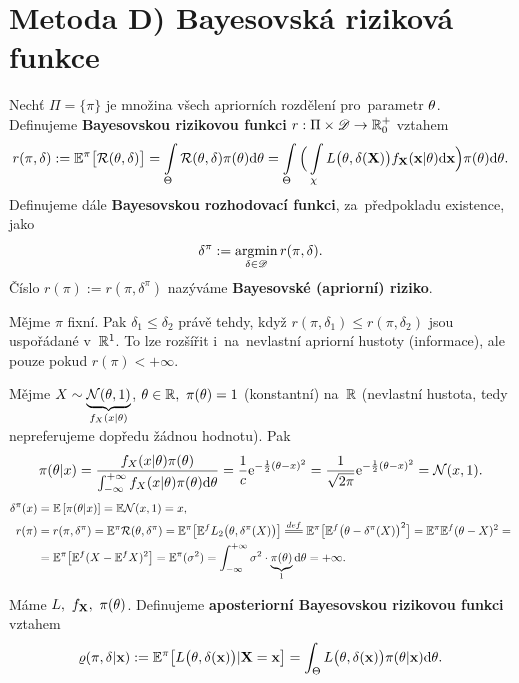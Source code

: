 \section{Metoda D) Bayesovská riziková funkce} 
\begin{define}
	Nechť $\Pi=\{ \pi\}$ je množina všech apriorních rozdělení pro~parametr $\theta$. Definujeme \textbf{Bayesovskou rizikovou funkci} $r:\Pi\times\mathscr{D} \to\mathbb{R}_0^+$ vztahem
	$$ r(\pi,\delta):=\mathbb{E}^\pi\big[ \mathcal{R}(\theta,\delta) \big]=\int\limits_{\Theta}\mathcal{R}(\theta,\delta)\pi(\theta)\mathrm{d}\theta=\int\limits_{\Theta}\Big( \int\limits_{\chi}L\big(\theta,\delta(\textbf{X})\big)f_\textbf{X}(\textbf{x}|\theta)\mathrm{d}\textbf{x} \Big)\pi(\theta)\mathrm{d}\theta.$$
	Definujeme dále \textbf{Bayesovskou rozhodovací funkci}, za~předpokladu existence, jako $$\delta^\pi:=\mathop{\mathrm{argmin}}\limits_{\delta\in\mathscr{D}}r(\pi,\delta).$$ 
	Číslo $r(\pi):=r(\pi,\delta^\pi)$ nazýváme \textbf{Bayesovské (apriorní) riziko}.  
	
\end{define}
\begin{remark}
	Mějme $\pi$ fixní. Pak $\delta_1\leq\delta_2$ právě tehdy, když $r(\pi,\delta_1)\leq r(\pi,\delta_2)$ jsou uspořádané v~$\mathbb{R}^1$. To lze rozšířit i~na~nevlastní apriorní hustoty (informace), ale pouze pokud $r(\pi)<+\infty$.
\end{remark}
\begin{example}
	Mějme $X\sim\underbrace{\mathcal{N}(\theta,1)}_{f_X(x|\theta)}$, $\theta\in\mathbb{R},~\pi(\theta)=1$ (konstantní) na~$\mathbb{R}$ (nevlastní hustota, tedy nepreferujeme dopředu žádnou hodnotu). Pak
	$$ \pi(\theta|x)=\frac{f_X(x|\theta) \pi(\theta)}{\int_{-\infty}^{+\infty}f_X(x|\theta) \pi(\theta)\mathrm{d}\theta}=\frac{1}{c}\mathrm{e}^{-\frac{1}{2}(\theta-x)^2}=\frac{1}{\sqrt{2\pi}}\mathrm{e}^{-\frac{1}{2}(\theta-x)^2}=\mathcal{N}(x,1).$$
	\[\begin{split}
	\delta^\pi(x)&=\EE{\pi(\t|x)}=\E\NN(x,1)=x,\\
	r(\pi)&= r(\pi,\delta^\pi)=\E^\pi \RF(\t,\delta^\pi)=\E^\pi\big[\E^f L_2\big(\t,\delta^\pi(X)\big)\big]\equal{def}\E^\pi\big[ \E^f\big(\t-\delta^\pi(X) \big)^2 \big]=\E^\pi\E^f(\t-X)^2=\\&=\E^\pi\big[ \E^f(X-\E^fX)^2 \big]=\E^\pi(\sigma^2)=\int_{-\infty}^{+\infty}\sigma^2\cdot \underbrace{\pi(\t)}_{1}\d\t=+\infty.
	\end{split}
	\]
\end{example}
\begin{define}
	Máme $L,~f_{\textbf{X}},~\pi(\theta)$. Definujeme \textbf{aposteriorní Bayesovskou rizikovou funkci} vztahem
	$$ \varrho(\pi,\delta|\textbf{x}):=\mathbb{E}^\pi\big[ L\big(\theta,\delta(\textbf{x})\big)|\textbf{X}=\textbf{x} \big]=\int_\Theta L\big(\theta,\delta(\textbf{x})\big)\pi(\theta|\textbf{x})\mathrm{d}\theta.$$ 
\end{define}

